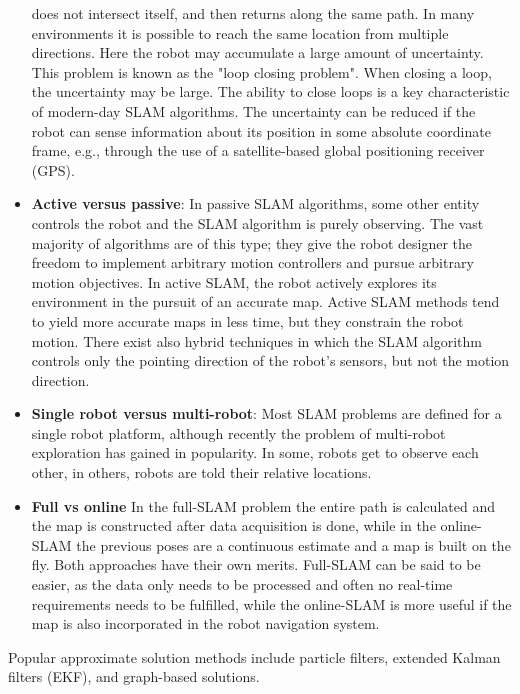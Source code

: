 \begin{itemize}
        does not intersect itself, and then returns along the same path.
        In many environments it is possible to reach the same location
        from multiple directions.
        Here the robot may accumulate a large amount of uncertainty.
        This problem is known as the "loop closing problem".
        When closing a loop, the uncertainty may be large.
        The ability to close loops is a key characteristic of modern-day
        SLAM algorithms.
        The uncertainty can be reduced if the robot can sense information
        about its position in some absolute coordinate frame, e.g.,
        through the use of a satellite-based global positioning receiver (GPS).
    \item \textbf{Active versus passive}: In passive SLAM algorithms,
        some other entity controls the robot and the SLAM algorithm is
        purely observing.
        The vast majority of algorithms are of this type;
        they give the robot designer the freedom to implement arbitrary
        motion controllers and pursue arbitrary motion objectives.
        In active SLAM, the robot actively explores its environment in
        the pursuit of an accurate map.
        Active SLAM methods tend to yield more accurate maps in less time,
        but they constrain the robot motion.
        There exist also hybrid techniques in which the SLAM algorithm
        controls only the pointing direction of the robot's sensors,
        but not the motion direction.
    \item \textbf{Single robot versus multi-robot}: Most SLAM problems are
        defined for a single robot platform, although recently the problem
        of multi-robot exploration has gained in popularity.
        In some, robots get to observe each other, in others,
        robots are told their relative locations.
    \item \textbf{Full vs online} In the full-SLAM problem the entire path
        is calculated and the map is constructed after data acquisition
        is done, while in the online-SLAM the previous poses are a
        continuous estimate and a map is built on the fly.
        Both approaches have their own merits.
        Full-SLAM can be said to be easier, as the data only needs to be
        processed and often no real-time requirements needs to be fulfilled,
        while the online-SLAM is more useful if the map is also
        incorporated in the robot navigation system.
\end{itemize}

Popular approximate solution methods include particle filters, extended
Kalman filters (EKF), and graph-based solutions.

